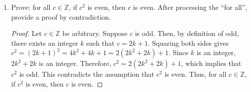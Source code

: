 \documentclass{article}
\begin{document}
\begin{enumerate}
            \newpage

      \item Prove: for all $c \in \mathbb{Z}$, if $c^2$ is even, then $c$ is even. After
            processing the ``for all'', provide a proof by contradiction.

            \begin{proof}
                  Let $c \in \mathbb{Z}$ be arbitrary. Suppose $c$ is odd. Then, by definition of odd, there exists an integer $k$ such that $c = 2k + 1$. Squaring both sides gives $c^2 = {(2k + 1)}^2 = 4k^2 + 4k + 1 = 2(2k^2 + 2k) + 1$. Since $k$ is an integer, $2k^2 + 2k$ is an integer. Therefore, $c^2 = 2(2k^2 + 2k) + 1$, which implies that $c^2$ is odd. This contradicts the assumption that $c^2$ is even. Thus, for all $c \in \mathbb{Z}$, if $c^2$ is even, then $c$ is even.
            \end{proof}

\end{enumerate}
\end{document}
